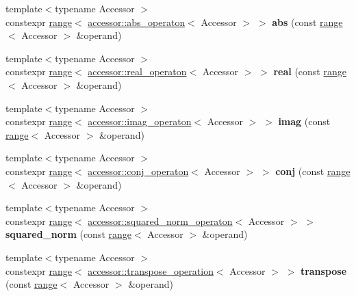 \begin{DoxyCompactItemize}
{\footnotesize template$<$typename Accessor $>$ }\\constexpr \hyperlink{classgko_1_1range}{range}$<$ \hyperlink{structgko_1_1accessor_1_1abs__operaton}{accessor\+::abs\+\_\+operaton}$<$ Accessor $>$ $>$ {\bfseries abs} (const \hyperlink{classgko_1_1range}{range}$<$ Accessor $>$ \&operand)
\item 
\mbox{\label{namespacegko_ac1abf93b0d48330b1d2dad93a30f7a67}} 
{\footnotesize template$<$typename Accessor $>$ }\\constexpr \hyperlink{classgko_1_1range}{range}$<$ \hyperlink{structgko_1_1accessor_1_1real__operaton}{accessor\+::real\+\_\+operaton}$<$ Accessor $>$ $>$ {\bfseries real} (const \hyperlink{classgko_1_1range}{range}$<$ Accessor $>$ \&operand)
\item 
\mbox{\label{namespacegko_ae11c76be937a8bf8393f4c1c27702dc0}} 
{\footnotesize template$<$typename Accessor $>$ }\\constexpr \hyperlink{classgko_1_1range}{range}$<$ \hyperlink{structgko_1_1accessor_1_1imag__operaton}{accessor\+::imag\+\_\+operaton}$<$ Accessor $>$ $>$ {\bfseries imag} (const \hyperlink{classgko_1_1range}{range}$<$ Accessor $>$ \&operand)
\item 
\mbox{\label{namespacegko_a5d217879d3f2759a2020e2ff5bbb2eca}} 
{\footnotesize template$<$typename Accessor $>$ }\\constexpr \hyperlink{classgko_1_1range}{range}$<$ \hyperlink{structgko_1_1accessor_1_1conj__operaton}{accessor\+::conj\+\_\+operaton}$<$ Accessor $>$ $>$ {\bfseries conj} (const \hyperlink{classgko_1_1range}{range}$<$ Accessor $>$ \&operand)
\item 
\mbox{\label{namespacegko_aaf85875a944e6e03c8427d3790e568c1}} 
{\footnotesize template$<$typename Accessor $>$ }\\constexpr \hyperlink{classgko_1_1range}{range}$<$ \hyperlink{structgko_1_1accessor_1_1squared__norm__operaton}{accessor\+::squared\+\_\+norm\+\_\+operaton}$<$ Accessor $>$ $>$ {\bfseries squared\+\_\+norm} (const \hyperlink{classgko_1_1range}{range}$<$ Accessor $>$ \&operand)
\item 
\mbox{\label{namespacegko_af0d61bb1d045d3cc21add96cd565cb56}} 
{\footnotesize template$<$typename Accessor $>$ }\\constexpr \hyperlink{classgko_1_1range}{range}$<$ \hyperlink{structgko_1_1accessor_1_1transpose__operation}{accessor\+::transpose\+\_\+operation}$<$ Accessor $>$ $>$ {\bfseries transpose} (const \hyperlink{classgko_1_1range}{range}$<$ Accessor $>$ \&operand)

\end{DoxyCompactItemize}
